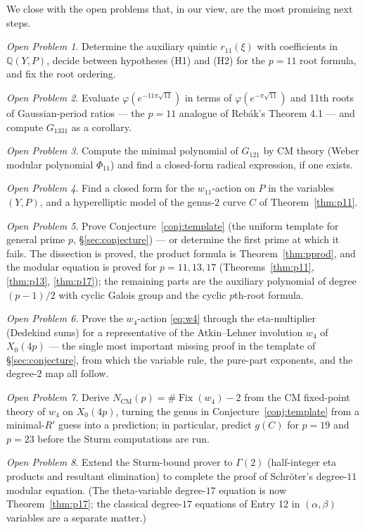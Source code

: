 \documentclass[11pt]{amsart}
\theoremstyle{plain}
\theoremstyle{definition}
\theoremstyle{remark}
\newtheorem*{openproblem}{Open Problem}
\newcommand{\Q}{\mathbb{Q}}
\begin{document}
We close with the open problems that, in our view, are the most promising next steps.
\begin{openproblem}
Determine the auxiliary quintic $r_{11}(\xi)$ with coefficients in $\Q(Y,P)$,
decide between hypotheses (H1) and (H2) for the $p=11$ root formula, and fix the
root ordering.
\end{openproblem}
\begin{openproblem}
Evaluate $\varphi(e^{-11\pi\sqrt{11}})$ in terms of $\varphi(e^{-\pi\sqrt{11}})$
and 11th roots of Gaussian-period ratios --- the $p=11$ analogue of Reb\'ak's
Theorem 4.1 --- and compute $G_{1331}$ as a corollary.
\end{openproblem}
\begin{openproblem}
Compute the minimal polynomial of $G_{121}$ by CM theory (Weber modular polynomial
$\Phi_{11}$) and find a closed-form radical expression, if one exists.
\end{openproblem}
\begin{openproblem}
Find a closed form for the $w_{11}$-action on $P$ in the variables $(Y,P)$, and a
hyperelliptic model of the genus-$2$ curve $C$ of Theorem~\ref{thm:p11}.
\end{openproblem}
\begin{openproblem}
Prove Conjecture~\ref{conj:template} (the uniform template for general prime $p$,
\S\ref{sec:conjecture}) --- or determine the first prime at which it fails.
The dissection is proved, the product formula is Theorem~\ref{thm:pprod}, and the
modular equation is proved for $p = 11, 13, 17$ (Theorems~\ref{thm:p11},
\ref{thm:p13}, \ref{thm:p17}); the remaining parts are the auxiliary polynomial
of degree $(p-1)/2$ with cyclic Galois group and the cyclic $p$th-root formula.
\end{openproblem}
\begin{openproblem}
Prove the $w_4$-action \eqref{eq:w4} through the eta-multiplier (Dedekind sums)
for a representative of the Atkin--Lehner involution $w_4$ of $X_0(4p)$ --- the
single most important missing proof in the template of \S\ref{sec:conjecture},
from which the variable rule, the pure-part exponents, and the degree-$2$ map
all follow.
\end{openproblem}
\begin{openproblem}
Derive $N_{\mathrm{CM}}(p) = \#\operatorname{Fix}(w_4) - 2$ from the CM
fixed-point theory of $w_4$ on $X_0(4p)$, turning the genus in
Conjecture~\ref{conj:template} from a minimal-$R'$ guess into a prediction; in
particular, predict $g(C)$ for $p = 19$ and $p = 23$ before the Sturm
computations are run.
\end{openproblem}
\begin{openproblem}
Extend the Sturm-bound prover to $\Gamma(2)$ (half-integer eta products and
resultant elimination) to complete the proof of Schr\"oter's degree-$11$ modular
equation. (The theta-variable degree-$17$ equation is now
Theorem~\ref{thm:p17}; the classical degree-$17$ equations of Entry 12 in
$(\alpha,\beta)$ variables are a separate matter.)
\end{openproblem}
\end{document}
